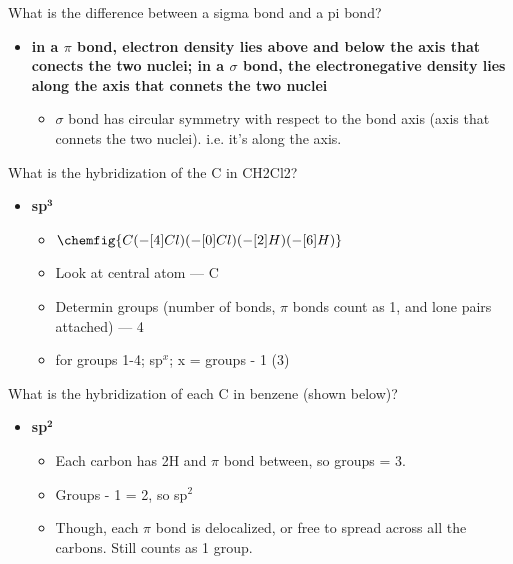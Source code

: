 \documentclass[12pt,a4paper]{article}
\begin{document}
\begin{enumerate}
\begin{itemize}
\begin{itemize}
                \end{itemize}
        \end{itemize}
    {\color{G-Moon}\item What is the difference between a sigma bond and a pi bond?}
        \begin{itemize}
            \item {\color{o-Sun}\textbf{in a $\pi$ bond, electron density lies above and below the axis that conects the two nuclei; in a $\sigma$ bond, the electronegative density lies along the axis that connets the two nuclei}}
                \begin{itemize}
                    \item $\sigma$ bond has circular symmetry with respect to the bond axis (axis that connets the two nuclei). i.e. it's along the axis.
                \end{itemize}
        \end{itemize}
    {\color{G-Moon}\item What is the hybridization of the C in CH2Cl2?}
        \begin{itemize}
            \item {\color{o-Sun}\textbf{sp\(\bm{^{3}}\)}}
                \begin{itemize}
                    \item $\chemfig{C(-[4]Cl)(-[0]Cl)(-[2]H)(-[6]H)}$
                    \item Look at central atom --- C
                    \item Determin groups (number of bonds, $\pi$ bonds count as 1, and lone pairs attached) --- 4 
                    \item for groups 1-4; sp{\color{o-Sun}\(^{x}\)}; x = groups - 1 ({\color{o-Sun}3})
                \end{itemize}
        \end{itemize}
    {\color{G-Moon}\item What is the hybridization of each C in benzene (shown below)?}
        \begin{itemize}
            \item {\color{o-Sun}\textbf{sp\(\bm{^{2}}\)}}
                \begin{itemize}
                    \item Each carbon has 2H and $\pi$ bond between, so groups = 3.
                    \item Groups - 1 = 2, so sp\(^{2}\)
                    \item Though, each $\pi$ bond is delocalized, or free to spread across all the carbons. Still counts as 1 group.
                \end{itemize}
        \end{itemize}
\end{enumerate}
\end{document}
